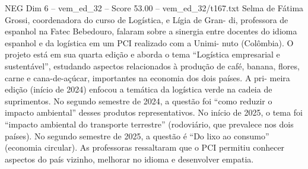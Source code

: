\begin{textsample}{NEG Dim 6 – vem\_ed\_32 – Score 53.00 – vem\_ed\_32/t167.txt}
Selma de Fátima Grossi, coordenadora do curso de Logística, e Lígia de Gran- di, professora de espanhol na Fatec Bebedouro, falaram sobre a sinergia entre docentes do idioma espanhol e da logística em um PCI realizado com a Unimi- nuto (Colômbia).
O projeto está em sua quarta edição e aborda o tema “Logística empresarial e sustentável”, estudando aspectos relacionados à produção de café, banana, flores, carne e cana-de-açúcar, importantes na economia dos dois países.
A pri- meira edição (início de 2024) enfocou a temática da logística verde na cadeia de suprimentos.
No segundo semestre de 2024, a questão foi “como reduzir o impacto ambiental” desses produtos representativos.
No início de 2025, o tema foi “impacto ambiental do transporte terrestre” (rodoviário, que prevalece nos dois países).
No segundo semestre de 2025, a questão é “Do lixo ao consumo” (economia circular).
As professoras ressaltaram que o PCI permitiu conhecer aspectos do país vizinho, melhorar no idioma e desenvolver empatia.

\end{textsample}
